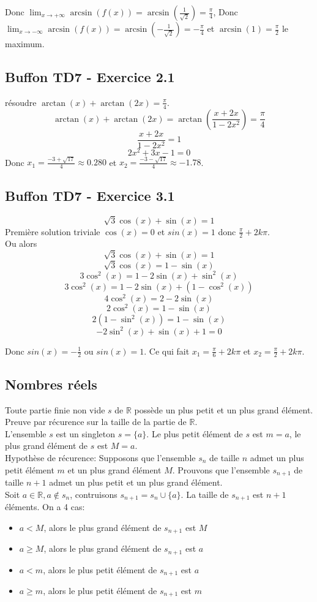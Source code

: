\documentclass[]{book}
\theoremstyle{definition}
\newcommand{\bb}[1]{\mathbb{#1}}
\newcommand{\R}{\bb{R}}
\begin{document}
Donc $\lim_{x\to+\infty} \arcsin(f(x)) = \arcsin(\frac{1}{\sqrt{2}}) = \frac{\pi}{4}$, Donc $\lim_{x\to-\infty} \arcsin(f(x)) = \arcsin(-\frac{1}{\sqrt{2}}) = -\frac{\pi}{4}$ et $\arcsin(1) = \frac{\pi}{2}$ le maximum.


\subsection*{Buffon TD7 - Exercice 2.1}
r\'esoudre $\arctan(x) + \arctan(2x) = \frac{\pi}{4}$.
$$\arctan(x) + \arctan(2x) = \arctan\left(\frac{x + 2x}{1-2x^2}\right) = \frac{\pi}{4}$$
$$\frac{x + 2x}{1-2x^2} = 1$$
$$2x^2 + 3x -1 = 0$$
Donc $x_1 = \frac{-3+\sqrt{17}}{4} \approx 0.280$ et $x_2 = \frac{-3-\sqrt{17}}{4} \approx -1.78$.

 \subsection*{Buffon TD7 - Exercice 3.1}
 $$\sqrt{3}\cos(x)+\sin(x) = 1$$
Premi\`ere solution triviale $\cos(x) = 0$ et $sin(x)=1$ donc $\frac{\pi}{2} +2k\pi$.\\

Ou alors
 $$\sqrt{3}\cos(x)+\sin(x) = 1$$
 $$\sqrt{3}\cos(x) = 1 - \sin(x)$$
 $$3\cos^2(x) = 1 - 2\sin(x) + \sin^2(x)$$
 $$3\cos^2(x) = 1 - 2\sin(x) + (1-\cos^2(x))$$
 $$4\cos^2(x) = 2 - 2\sin(x)$$
 $$2\cos^2(x) = 1 - \sin(x)$$
 $$2(1-\sin^2(x)) = 1 - \sin(x)$$
 $$-2\sin^2(x) + \sin(x) + 1 = 0$$
 
 Donc $sin(x) = -\frac{1}{2}$ ou $sin(x) = 1$. Ce qui fait $x_1 = \frac{\pi}{6} +2k\pi$ et $x_2 = \frac{\pi}{2} +2k\pi$.

 
 \newpage
 \subsection*{Nombres r\'eels}
Toute partie finie non vide $s$ de $\R$ poss\`ede un plus petit et un plus grand \'el\'ement. \\
Preuve par r\'ecurence sur la taille de la partie de $\R$.\\
L'ensemble $s$ est un singleton $s=\{a\}$. Le plus petit \'el\'ement de $s$ est $m = a$, le plus grand \'el\'ement de $s$ est $M = a$.\\
Hypoth\`ese de r\'ecurence: Supposons que l'ensemble $s_n$ de taille $n$ admet un  plus petit \'el\'ement $m$ et un plus grand \'el\'ement $M$. Prouvons que l'ensemble $s_{n+1}$ de taille $n+1$ admet un plus petit et un plus grand \'el\'ement.\\
Soit $a \in \R, a \notin s_n$, contruisons $s_{n+1} = s_n \cup \{a\}$. La taille de $s_{n+1}$ est $n+1$ \'el\'ements. On a 4 cas:
\begin{itemize}
\item $a < M$, alors le plus grand \'el\'ement de $s_{n+1}$ est $M$
\item $a \geq M$, alors le plus grand \'el\'ement de $s_{n+1}$ est $a$
\item $a < m$, alors le plus petit \'el\'ement de $s_{n+1}$ est $a$
\item $a \geq m$, alors le plus petit \'el\'ement de $s_{n+1}$ est $m$
\end{itemize}
\end{document}
